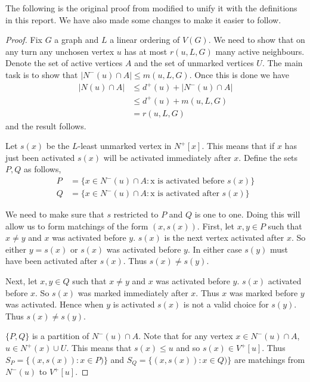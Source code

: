 The following is the original proof from \cite{KIERSTEAD2000} modified to unify it with the definitions in this report. We have also made some changes to make it easier to follow.

\begin{proof}
    Fix $G$ a graph and $L$ a linear ordering of $V(G)$. We need to show that on any turn any unchosen vertex $u$ has at most $r(u,L,G)$ many active neighbours. Denote the set of active vertices $A$ and the set of unmarked vertices $U$. The main task is to show that $|N^-(u)\cap A|\leq m(u,L,G)$. Once this is done we have 
    \begin{align*}
        |N(u)\cap A| &\leq d^+(u) + |N^-(u)\cap A| \\
        & \leq  d^+(u) + m(u,L,G) \\
        & = r(u,L,G)
    \end{align*} 
    and the result follows.
    
    Let $s(x)$ be the $L$-least unmarked vertex in $N^+[x]$. This means that if $x$ has just been activated $s(x)$ will be activated immediately after $x$. Define the sets $P,Q$ as follows,
    \begin{align*}
        P&=\{x\in N^-(u)\cap A : \text{x is activated before $s(x)$}\} \\        
        Q&=\{x\in N^-(u)\cap A : \text{x is activated after $s(x)$}\}
    \end{align*}
    
    We need to make sure that $s$ restricted to $P$ and $Q$ is one to one. Doing this will allow us to form matchings of the form $(x,s(x))$. First, let $x,y\in P$ such that $x\neq y$ and $x$ was activated before $y$. $s(x)$ is the next vertex activated after $x$. So either $y = s(x)$ or $s(x)$ was activated before $y$. In either case $s(y)$ must have been activated after $s(x)$. Thus $s(x)\neq s(y)$.
    
    Next, let $x,y\in Q$ such that $x\neq y$ and $x$ was activated before $y$. $s(x)$ activated before $x$. So $s(x)$ was marked immediately after $x$. Thus $x$ was marked before $y$ was activated. Hence when $y$ is activated $s(x)$ is not a valid choice for $s(y)$. Thus $s(x)\neq s(y)$.
    
    $\{P,Q\}$ is a partition of $N^-(u)\cap A$. Note that for any vertex $x\in N^-(u)\cap A$, $u\in N^+(x)\cup U$. This means that $s(x)\leq u$ and so $s(x)\in V^+[u]$. Thus $S_P = \{(x,s(x)):x\in P)\}$ and $S_Q = \{(x,s(x)):x\in Q)\}$ are matchings from $N^-(u)$ to $V^+[u]$.
    

\end{proof}
